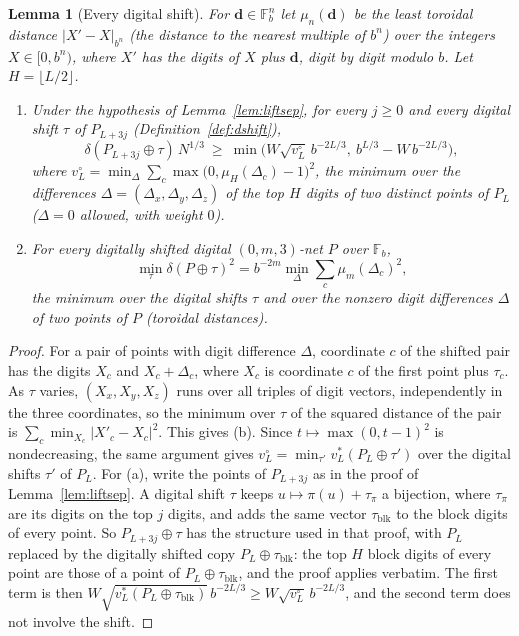 \documentclass[11pt]{amsart}
\newtheorem{lemma}[theorem]{Lemma}
\theoremstyle{definition}
\theoremstyle{plain}
\newcommand{\F}{\mathbb{F}}
\begin{document}
\begin{lemma}[Every digital shift]\label{lem:shiftcert}
For $\mathbf d\in\F_b^n$ let $\mu_n(\mathbf d)$ be the least toroidal distance $|X'-X|_{b^n}$ (the distance to the nearest multiple of $b^n$) over the integers $X\in[0,b^n)$, where $X'$ has the digits of $X$ plus $\mathbf d$, digit by digit modulo $b$. Let $H=\lfloor L/2\rfloor$.
\begin{enumerate}
\item[(a)] Under the hypothesis of Lemma~\ref{lem:liftsep}, for every $j\ge0$ and every digital shift $\tau$ of $P_{L+3j}$ (Definition~\ref{def:dshift}),
\[
\delta(P_{L+3j}\oplus\tau)\,N^{1/3}\ \ge\ \min\bigl(W\sqrt{v^\circ_L}\,b^{-2L/3},\ b^{L/3}-W\,b^{-2L/3}\bigr),
\]
where $v^\circ_L=\min_\Delta\sum_c\max\bigl(0,\mu_H(\Delta_c)-1\bigr)^2$, the minimum over the differences $\Delta=(\Delta_x,\Delta_y,\Delta_z)$ of the top $H$ digits of two distinct points of $P_L$ ($\Delta=0$ allowed, with weight $0$).
\item[(b)] For every digitally shifted digital $(0,m,3)$-net $P$ over $\F_b$,
\[
\min_\tau\delta(P\oplus\tau)^2=b^{-2m}\min_\Delta\textstyle\sum_c\mu_m(\Delta_c)^2,
\]
the minimum over the digital shifts $\tau$ and over the nonzero digit differences $\Delta$ of two points of $P$ (toroidal distances).
\end{enumerate}
\end{lemma}

\begin{proof}
For a pair of points with digit difference $\Delta$, coordinate $c$ of the shifted pair has the digits $X_c$ and $X_c+\Delta_c$, where $X_c$ is coordinate $c$ of the first point plus $\tau_c$. As $\tau$ varies, $(X_x,X_y,X_z)$ runs over all triples of digit vectors, independently in the three coordinates, so the minimum over $\tau$ of the squared distance of the pair is $\sum_c\min_{X_c}|X'_c-X_c|^2$. This gives (b). Since $t\mapsto\max(0,t-1)^2$ is nondecreasing, the same argument gives $v^\circ_L=\min_{\tau'}v^*_L(P_L\oplus\tau')$ over the digital shifts $\tau'$ of $P_L$. For (a), write the points of $P_{L+3j}$ as in the proof of Lemma~\ref{lem:liftsep}. A digital shift $\tau$ keeps $u\mapsto\pi(u)+\tau_\pi$ a bijection, where $\tau_\pi$ are its digits on the top $j$ digits, and adds the same vector $\tau_{\mathrm{blk}}$ to the block digits of every point. So $P_{L+3j}\oplus\tau$ has the structure used in that proof, with $P_L$ replaced by the digitally shifted copy $P_L\oplus\tau_{\mathrm{blk}}$: the top $H$ block digits of every point are those of a point of $P_L\oplus\tau_{\mathrm{blk}}$, and the proof applies verbatim. The first term is then $W\sqrt{v^*_L(P_L\oplus\tau_{\mathrm{blk}})}\,b^{-2L/3}\ge W\sqrt{v^\circ_L}\,b^{-2L/3}$, and the second term does not involve the shift.
\end{proof}
\end{document}

